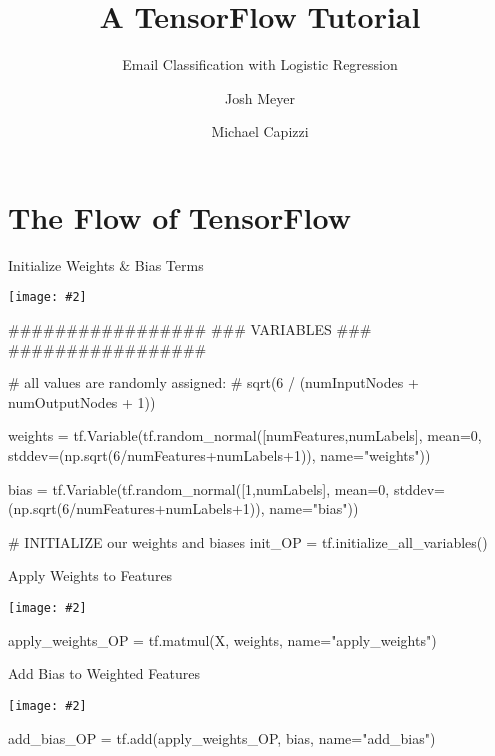 \documentclass[14pt]{beamer}
\newcommand {\framedgraphic}[2] { %
    \begin{frame}{#1}
        \begin{center}
            \texttt{[image: \#2]}
        \end{center}
    \end{frame}
}
\begin{document}
\title{A TensorFlow Tutorial}  
\subtitle{Email Classification with Logistic Regression}
\author{Josh Meyer  \and Michael Capizzi }
\date{} 

\frame{\titlepage} 




\section{The Flow of TensorFlow}


\framedgraphic{Initialize Weights \& Bias Terms}{1-initialization.png}

\begin{frame}[fragile]
  \begin{python}
#################
### VARIABLES ###
#################

# all values are randomly assigned:
# sqrt(6 / (numInputNodes + numOutputNodes + 1))

weights = tf.Variable(tf.random_normal([numFeatures,numLabels],
          mean=0,
          stddev=(np.sqrt(6/numFeatures+numLabels+1)),
          name="weights"))

bias = tf.Variable(tf.random_normal([1,numLabels],
       mean=0,
       stddev=(np.sqrt(6/numFeatures+numLabels+1)),
       name="bias"))


# INITIALIZE our weights and biases
init_OP = tf.initialize_all_variables()
  \end{python}
\end{frame}


\framedgraphic{Apply Weights to Features}{2-apply-weights.png}

\begin{frame}[fragile]
  \begin{python}
apply_weights_OP = tf.matmul(X, weights, name="apply_weights")
  \end{python}
\end{frame}


\framedgraphic{Add Bias to Weighted Features}{3-add-bias.png}

\begin{frame}[fragile]
  \begin{python}
add_bias_OP = tf.add(apply_weights_OP, bias, name="add_bias") 
  \end{python}
\end{frame}
\end{document}
